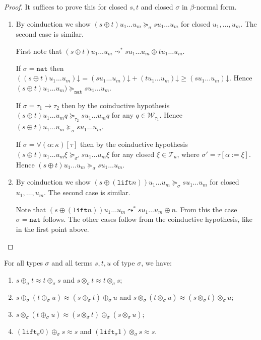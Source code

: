 \documentclass[a4paper,UKenglish,cleveref,autoref,numberwithinsect]{lipics-v2019}
\theoremstyle{definition}
\newcommand{\World}{\mathcal{W}}
\newcommand{\arrtype}{\rightarrow}
\newcommand{\subst}[2]{#1:=#2}
\newcommand{\nat}{\mathtt{nat}}
\newcommand{\lift}{\mathtt{lift}}
\newcommand{\Tc}{\mathcal{T}}
\newcommand{\da}{\mathord{\downarrow}}
\begin{document}
\begin{proof}
  It suffices to prove this for closed $s,t$ and closed $\sigma$ in
  $\beta$-normal form.
  \begin{enumerate}
  \item By coinduction we show $(s \oplus t) u_1 \ldots u_m
    \succeq_\sigma s u_1 \ldots u_m$ for closed $u_1,\ldots,u_m$. The
    second case is similar.

    First note that $(s \oplus t) u_1 \ldots u_m \leadsto^* s u_1
    \ldots u_m \oplus t u_1 \ldots u_m$.

    If $\sigma = \nat$ then $((s \oplus t) u_1 \ldots u_m)\da = (s u_1
    \ldots u_m)\da + (t u_1 \ldots u_m)\da \ge (s u_1 \ldots
    u_m)\da$. Hence $(s \oplus t) u_1 \ldots u_m) \succeq_\nat s u_1
    \ldots u_m$.

    If $\sigma = \tau_1\arrtype\tau_2$ then by the coinductive
    hypothesis $(s \oplus t) u_1 \ldots u_m q \succeq_{\tau_2} s u_1
    \ldots u_m q$ for any $q \in \World_{\tau_1}$. Hence $(s \oplus t)
    u_1 \ldots u_m \succeq_\sigma s u_1 \ldots u_m$.

    If $\sigma = \forall(\alpha:\kappa)[\tau]$ then by the coinductive
    hypothesis $(s \oplus t) u_1 \ldots u_m \xi \succeq_{\sigma'} s
    u_1 \ldots u_m \xi$ for any closed $\xi \in \Tc_\kappa$, where
    $\sigma' = \tau[\subst{\alpha}{\xi}]$. Hence $(s \oplus t) u_1
    \ldots u_m \succeq_\sigma s u_1 \ldots u_m$.
  \item By coinduction we show $(s \oplus (\lift n)) u_1 \ldots u_m
    \succeq_\sigma s u_1 \ldots u_m$ for closed $u_1,\ldots,u_m$. The
    second case is similar.

    Note that $(s \oplus (\lift n)) u_1 \ldots u_m \leadsto^* s u_1
    \ldots u_m \oplus n$. From this the case $\sigma=\nat$
    follows. The other cases follow from the coinductive hypothesis,
    like in the first point above.\qedhere
  \end{enumerate}
\end{proof}

{ \renewcommand{\thelemma}{\ref{lem:approxproperties}}
\begin{lemma}
For all types $\sigma$ and all terms $s,t,u$ of type $\sigma$, we
have:
\begin{enumerate}
\item $s \oplus_\sigma t \approx t \oplus_\sigma s$ and $s
  \otimes_\sigma t \approx t \otimes_\sigma s$;
\item $s \oplus_\sigma (t \oplus_\sigma u) \approx (s \oplus_\sigma t)
  \oplus_\sigma u$ and $s \otimes_\sigma (t \otimes_\sigma u) \approx
  (s \otimes_\sigma t) \otimes_\sigma u$;
\item $s \otimes_\sigma (t \oplus_\sigma u) \approx (s \otimes_\sigma
  t) \oplus_\sigma (s \otimes_\sigma u)$;
\item $(\lift_\sigma 0) \oplus_\sigma s \approx s$ and $(\lift_\sigma
  1) \otimes_\sigma s \approx s$.
\end{enumerate}
\end{lemma}
\addtocounter{theorem}{-1}}
\end{document}
